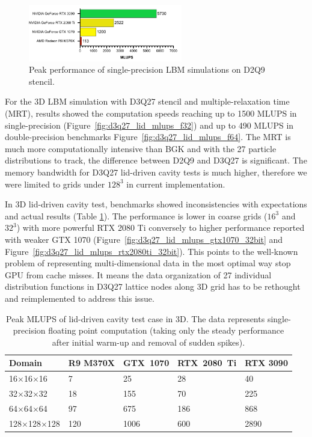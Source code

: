\begin{figure}[!ht]
	\centering
	\includegraphics[width=0.6\textwidth]{data/max_mlups_2d.pdf}
	\caption{Peak performance of single-precision LBM simulations on D2Q9 stencil.}
	\label{fig:max_mlups}
\end{figure}

For the 3D LBM simulation with D3Q27 stencil and multiple-relaxation time (MRT), results showed the computation speeds reaching up to 1500 MLUPS in single-precision (Figure~\ref{fig:d3q27_lid_mlups_f32}) and up to 490 MLUPS in double-precision benchmarks Figure~\ref{fig:d3q27_lid_mlups_f64}. The MRT is much more computationally intensive than BGK and with the 27 particle distributions to track, the difference between D2Q9 and D3Q27 is significant. The memory bandwidth for D3Q27 lid-driven cavity tests is much higher, therefore we were limited to grids under $128^3$ in current implementation.

In 3D lid-driven cavity test, benchmarks showed inconsistencies with expectations and actual results (Table \ref{tab:lid-mlups-all-3d}). The performance is lower in coarse grids ($16^3$ and $32^3$) with more powerful RTX 2080 Ti conversely to higher performance reported with weaker GTX 1070 (Figure~\ref{fig:d3q27_lid_mlups_gtx1070_32bit} and Figure~\ref{fig:d3q27_lid_mlups_rtx2080ti_32bit}). This points to the well-known problem of representing multi-dimensional data in the most optimal way stop GPU from cache misses. It means the data organization of 27 individual distribution functions in D3Q27 lattice nodes along 3D grid has to be rethought and reimplemented to address this issue.  

\begin{table}[!ht]
	\centering\small
	{\renewcommand{\arraystretch}{1.1}%
		{\setlength{\tabcolsep}{0.5em}
	\begin{tabular}{ |p{3.2cm}||p{2.2cm}|p{2.2cm}|p{2.4cm}|p{2.2cm}|  }
		\hline
		Domain & R9 M370X & GTX~1070 & RTX~2080~Ti & RTX 3090 \\
		\hline
		16$\times$16$\times$16   & 7 & 25  & 28  & 40  \\
		\hline
		32$\times$32$\times$32   & 18 & 155  & 70   & 225  \\
		\hline
		64$\times$64$\times$64   & 97 & 675  & 186   & 868  \\
		\hline
		128$\times$128$\times$128   & 120 & 1006  & 600   & 2890  \\
		\hline
	\end{tabular}}}
	\caption{Peak MLUPS of lid-driven cavity test case in 3D. The data represents single-precision floating point computation (taking only the steady performance after initial warm-up and removal of sudden spikes).}
	\label{tab:lid-mlups-all-3d}
\end{table}

